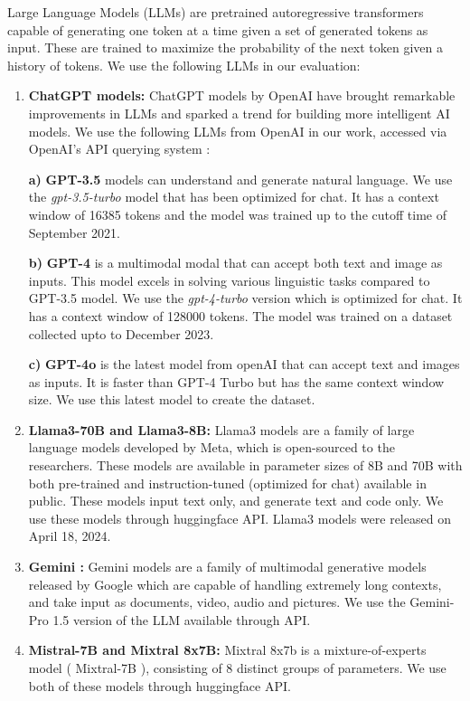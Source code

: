 \documentclass[conference]{IEEEtran}
\begin{document}
Large Language Models (LLMs) are pretrained autoregressive transformers \cite{vaswani2017attention} capable of generating one token at a time given a set of generated tokens as input. These are trained to maximize the probability of the next token given a history of tokens. We use the following LLMs in our evaluation:
\begin{enumerate}
    \item \textbf{ChatGPT models:} ChatGPT models by OpenAI have brought remarkable improvements in LLMs and sparked a trend for building more intelligent AI models. We use the following LLMs from OpenAI in our work, accessed via OpenAI’s API querying system \cite{gptapi}: 
    
   \textbf{ a)} \textbf{GPT-3.5} models can understand and generate natural language. We use the \textit{gpt-3.5-turbo} model that has been optimized for chat. It has a context window of 16385 tokens and the model was trained up to the cutoff time of September 2021.
    
  \textbf{  b)} \textbf{GPT-4} is a multimodal modal that can accept both text and image as inputs. This model excels in solving various linguistic tasks compared to GPT-3.5 model. We use the \textit{gpt-4-turbo} version which is optimized for chat. It has a context window of 128000 tokens. The model was trained on a dataset collected upto to December 2023.
    
   \textbf{ c)} \textbf{GPT-4o} is the latest model from openAI that can accept text and images as inputs. It is faster than GPT-4 Turbo but has the same context window size. We use this latest model to create the dataset.


\item \textbf{Llama3-70B and Llama3-8B:} Llama3 models \cite{llama370b} are a family of large language models developed by Meta, which is open-sourced to the researchers. These models are available in parameter sizes of 8B and 70B with both pre-trained and instruction-tuned (optimized for chat) available in public. These models input text only, and generate text and code only. We use these models through huggingface API. Llama3 models were released on April 18, 2024.


\item \textbf{Gemini \cite{gemini}:} Gemini models are a family of multimodal generative models released by Google which are capable of handling extremely long contexts, and take input as documents, video, audio and pictures. We use the Gemini-Pro 1.5 version of the LLM available through API.

\item \textbf{Mistral-7B and Mixtral 8x7B:} Mixtral 8x7b \cite{mixtral8x7b} is a mixture-of-experts model ( Mixtral-7B \cite{jiang2023mistral}), consisting of 8 distinct groups of parameters.  We use both of these models through huggingface API.

\end{enumerate}
\end{document}
